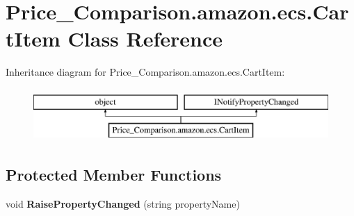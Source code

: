 \hypertarget{class_price___comparison_1_1amazon_1_1ecs_1_1_cart_item}{\section{Price\-\_\-\-Comparison.\-amazon.\-ecs.\-Cart\-Item Class Reference}
\label{class_price___comparison_1_1amazon_1_1ecs_1_1_cart_item}
}


 


Inheritance diagram for Price\-\_\-\-Comparison.\-amazon.\-ecs.\-Cart\-Item\-:\begin{figure}[H]
\begin{center}
\leavevmode
\includegraphics[height=2.000000cm]{class_price___comparison_1_1amazon_1_1ecs_1_1_cart_item}
\end{center}
\end{figure}
\subsection*{Protected Member Functions}
\begin{DoxyCompactItemize}
\item 
\hypertarget{class_price___comparison_1_1amazon_1_1ecs_1_1_cart_item_ab975b13d258184fec13ed5eca91fe889}{void {\bfseries Raise\-Property\-Changed} (string property\-Name)}\label{class_price___comparison_1_1amazon_1_1ecs_1_1_cart_item_ab975b13d258184fec13ed5eca91fe889}

\end{DoxyCompactItemize}
